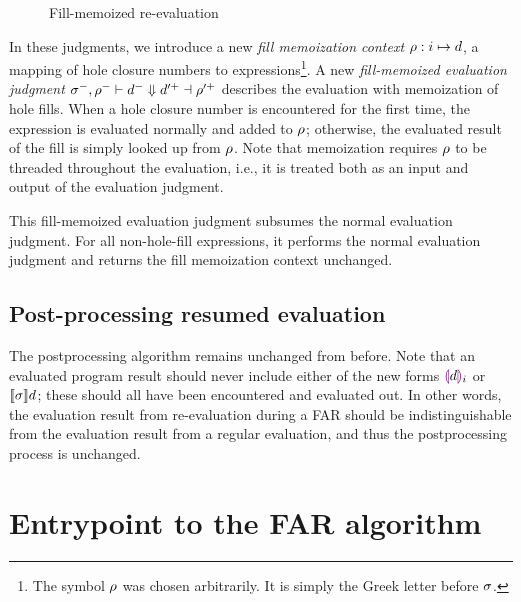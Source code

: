 \begin{figure}
  \centering
  \begin{mdframed}
    \begin{singlespace}
      
    \end{singlespace}
  \end{mdframed}
  \caption{Fill-memoized re-evaluation}
  \label{fig:fill-memoized-resume}
\end{figure}

In these judgments, we introduce a new \textit{fill memoization context} $\rho:i\mapsto d$, a mapping of hole closure numbers to expressions\footnote{The symbol $\rho$ was chosen arbitrarily. It is simply the Greek letter before $\sigma$.}. A new \textit{fill-memoized evaluation judgment} $\sigma^-,\rho^-\vdash d^-\Downarrow d'^+\dashv\rho'^+$ describes the evaluation with memoization of hole fills. When a hole closure number is encountered for the first time, the expression is evaluated normally and added to $\rho$; otherwise, the evaluated result of the fill is simply looked up from $\rho$. Note that memoization requires $\rho$ to be threaded throughout the evaluation, i.e., it is treated both as an input and output of the evaluation judgment.

This fill-memoized evaluation judgment subsumes the normal evaluation judgment. For all non-hole-fill expressions, it performs the normal evaluation judgment and returns the fill memoization context unchanged.

\subsection{Post-processing resumed evaluation}
\label{sec:far-postprocessing}

The postprocessing algorithm remains unchanged from before. Note that an evaluated program result should never include either of the new forms $\textcolor{violet}{\llparenthesis} d\textcolor{violet}{\rrparenthesis}_i$ or $\llbracket\sigma\rrbracket d$; these should all have been encountered and evaluated out. In other words, the evaluation result from re-evaluation during a FAR should be indistinguishable from the evaluation result from a regular evaluation, and thus the postprocessing process is unchanged.


\section{Entrypoint to the FAR algorithm}
\label{sec:far-entrypoint}

